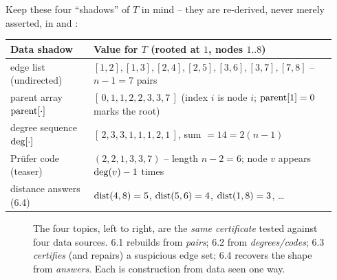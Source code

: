 \medskip
\noindent Keep these four ``shadows'' of $T$ in mind -- they are re-derived, never merely asserted,
in  and :
\begin{center}
\renewcommand{\arraystretch}{1.25}
\setlength{\tabcolsep}{5pt}
\begin{tabular}{@{}p{0.24\linewidth} p{0.70\linewidth}@{}}
\toprule
\textbf{Data shadow} & \textbf{Value for $T$ (rooted at $1$, nodes $1..8$)} \\
\midrule
edge list (undirected)   & $[1,2],[1,3],[2,4],[2,5],[3,6],[3,7],[7,8]$ -- $n-1=7$ pairs \\
parent array $\operatorname{parent}[\cdot]$ & $[\,0,1,1,2,2,3,3,7\,]$ (index $i$ is node $i$; $\operatorname{parent}[1]=0$ marks the root) \\
degree sequence $\operatorname{deg}[\cdot]$ & $[\,2,3,3,1,1,1,2,1\,]$, sum $=14=2(n-1)$ \\
Pr\"ufer code (teaser)    & $(2,2,1,3,3,7)$ -- length $n-2=6$; node $v$ appears $\operatorname{deg}(v)-1$ times \\
distance answers (6.4)   & $\operatorname{dist}(4,8)=5$, $\operatorname{dist}(5,6)=4$, $\operatorname{dist}(1,8)=3$, \ldots\\
\bottomrule
\end{tabular}
\end{center}

\begin{figure}[H]
\centering
{}
\caption*{The four topics, left to right, are the \emph{same certificate} tested against four data
sources. 6.1 rebuilds from \emph{pairs}; 6.2 from \emph{degrees/codes}; 6.3 \emph{certifies} (and
repairs) a suspicious edge set; 6.4 recovers the shape from \emph{answers}. Each is construction
from data seen one way.}
\end{figure}

